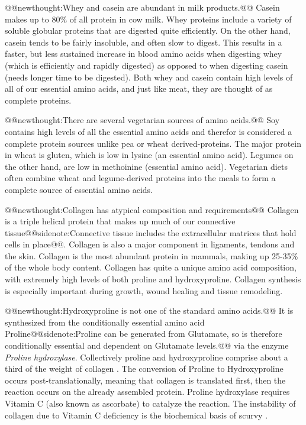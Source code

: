 \documentclass{tufte-handout}
\makeatletter
\def\newthought#1{@@newthought:#1@@}
\def\sidenote#1{@@sidenote:#1@@}
\makeatother
\begin{document}
\newthought{Whey and casein are abundant in milk products.}  Casein makes up to 80\% of all protein in cow milk.  Whey proteins include a variety of soluble globular proteins that are digested quite efficiently.  On the other hand, casein tends to be fairly insoluble, and often slow to digest.  This results in a faster, but less sustained increase in blood amino acids when digesting whey (which is efficiently and rapidly digested) as opposed to when digesting casein (needs longer time to be digested).  Both whey and casein contain high levels of all of our essential amino acids, and just like meat, they are thought of as complete proteins.

\newthought{There are several vegetarian sources of amino acids.}  Soy contains high levels of all the essential amino acids and therefor is considered a complete protein sources unlike pea or wheat derived-proteins.  The major protein in wheat is gluten, which is low in lysine (an essential amino acid).  Legumes on the other hand, are low in methoinine (essential amino acid).  Vegetarian diets often combine wheat and legume-derived proteins into the meals to form a complete source of essential amino acids.

\newthought{Collagen has atypical composition and requirements}
Collagen is a triple helical protein that makes up much of our connective tissue\sidenote{Connective tissue includes the extracellular matrices that hold cells in place}.  Collagen is also a major component in ligaments, tendons and the skin.  Collagen is the most abundant protein in mammals, making up 25-35\% of the whole body content.  Collagen has quite a unique amino acid composition, with extremely high levels of both proline and hydroxyproline.  Collagen synthesis is especially important during growth, wound healing and tissue remodeling.

\newthought{Hydroxyproline is not one of the standard amino acids.}  It is synthesized from the conditionally essential amino acid Proline\sidenote{Proline can be generated from Glutamate, so is therefore conditionally essential and dependent on Glutamate levels.} via the enzyme \emph{Proline hydroxylase}.  Collectively proline and hydroxyproline comprise about a third of the weight of collagen \citep{Bowes1948}.  The conversion of Proline to Hydroxyproline occurs post-translationally, meaning that collagen is translated first, then the reaction occurs on the already assembled protein.  Proline hydroxylase requires Vitamin C (also known as ascorbate) to catalyze the reaction.  The instability of collagen due to Vitamin C deficiency is the biochemical basis of scurvy \cite{Lind1753}. 
\end{document}
